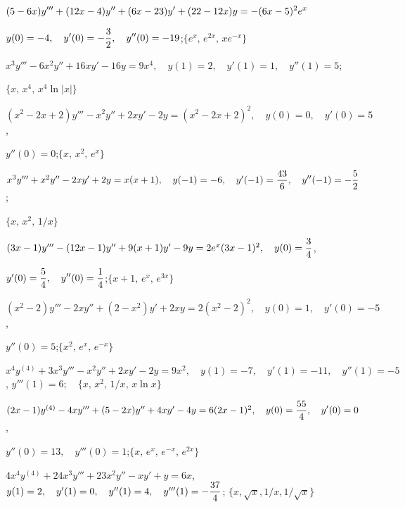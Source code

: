 \begin{exerciselist}
  \item\label{exer:9.4.24} $\displaystyle{(5-6x)y'''+(12x-4)y''+(6x-23)y'+(22-12x)y=-(6x-5)^{2}e^{x}}$

  $\displaystyle{y(0)=-4,\quad y'(0)=-\frac{3}{2},\quad y''(0)=-19}$;\quad $\{e^{x},\,e^{2x},\,xe^{-x}\}$

  \item\label{exer:9.4.25}
        $x^{3}y'''-6x^{2}y''+16xy'-16y=9x^{4},\quad y(1)=2,\quad y'(1)=1,\quad y''(1)=5$;

  $\{x,\,x^{4},\,x^{4}\ln|x|\}$

  \item\label{exer:9.4.26} \CGex
        $(x^{2}-2x+2)y'''-x^{2}y''+2xy'-2y=(x^{2}-2x+2)^{2},\quad y(0)=0,\quad y'(0)=5$,

  $y''(0)=0$;\quad $\{x,\,x^{2},\,e^{x}\}$

  \item\label{exer:9.4.27}
        $x^{3}y'''+x^{2}y''-2xy'+2y=x(x+1),\quad y(-1)=-6,\quad y'(-1)=\displaystyle\frac{43}{6},\quad y''(-1)= -\displaystyle\frac{5}{2}$;\quad

  $\{x,\,x^{2},\,1/x\}$

  \item\label{exer:9.4.28}
        $(3x-1)y'''-(12x-1)y''+9(x+1)y'-9y=2e^{x}(3x-1)^{2},\quad y(0)=\displaystyle\frac{3}{4}$,

  $y'(0)=\displaystyle\frac{5}{4},\quad y''(0)=\displaystyle\frac{1}{4}$;\quad $\{x+1,\,e^{x},\,e^{3x}\}$

  \item\label{exer:9.4.29} \CGex
        $(x^{2}-2)y'''-2xy''+(2-x^{2})y'+2xy=2(x^{2}-2)^{2},\quad y(0)=1,\quad y'(0)=-5$,

  $y''(0)=5$;\quad $\{x^{2},\,e^{x},\,e^{-x}\}$

  \item\label{exer:9.4.30} \CGex
        $x^{4}y^{(4)}+3x^{3}y'''-x^{2}y''+2xy'-2y=9x^{2},\quad y(1)=-7,\quad y'(1)= -11,\quad y''(1)=-5$,\;
        $y'''(1)=6;\quad\{x,\,x^{2},\,1/x,\,x\ln x\}$

  \item\label{exer:9.4.31}
        $(2x-1)y^{(4)}-4xy'''+(5-2x)y''+4xy'-4y=6(2x-1)^{2},\quad y(0)=\displaystyle\frac{55}{4}, \quad y'(0)=0$,

  $y''(0)=13,\quad y'''(0)=1$;\quad $\{x,\,e^{x},\,e^{-x},\,e^{2x}\}$

  \item\label{exer:9.4.32} $4x^{4}y^{(4)}+24x^{3}y'''+23x^{2}y''-xy'+y=6x$,\quad
        $y(1)=2,\quad y'(1)=0,\quad y''(1)=4,\quad y'''(1)=-\displaystyle\frac{37}{4}$; \quad
        $\{x,\sqrt{x},1/x,1/\sqrt{x}\}$


\end{exerciselist}
